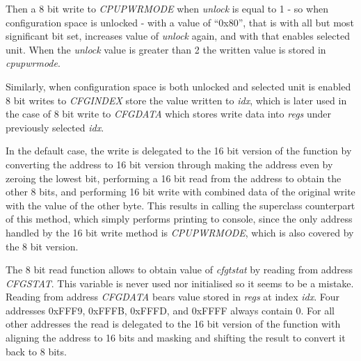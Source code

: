 Then a 8 bit write to \emph{CPUPWRMODE} when \emph{unlock} is equal to 1 -  so
when configuration space is unlocked - with a value of ``0x80'', that is with all
but most significant bit set, increases value of \emph{unlock} again, and with
that enables selected unit. When the \emph{unlock} value is greater than 2 the
written value is stored in \emph{cpupwrmode}.

\begin{codeblock}
    
\end{codeblock}

Similarly, when configuration space is both unlocked and selected unit is
enabled 8 bit writes to \emph{CFGINDEX} store the value written to \emph{idx},
which is later used in the case of 8 bit write to \emph{CFGDATA} which stores write
data into \emph{regs} under previously selected \emph{idx}.

\begin{codeblock}
    
\end{codeblock}

In the default case, the write is delegated to the 16 bit version of the
function by converting the address to 16 bit version through making the address
even by zeroing the lowest bit, performing a 16 bit read from the address to
obtain the other 8 bits, and performing 16 bit write with combined data of the
original write with the value of the other byte. This results in calling the
superclass counterpart of this method, which simply performs printing to
console, since the only address handled by the 16 bit write method is
\emph{CPUPWRMODE}, which is also covered by the 8 bit version.

The 8 bit read function allows to obtain value of \emph{cfgtstat} by reading
from address \emph{CFGSTAT}. This variable is never used nor initialised so it
seems to be a mistake. Reading from address \emph{CFGDATA} bears value
stored in \emph{regs} at index \emph{idx}. Four addresses 0xFFF9, 0xFFFB,
0xFFFD, and 0xFFFF always contain 0. For all other addresses the read is
delegated to the 16 bit version of the function with aligning the address to 16
bits and masking and shifting the result to convert it back to 8 bits.

\begin{codeblock}
    
\end{codeblock}

